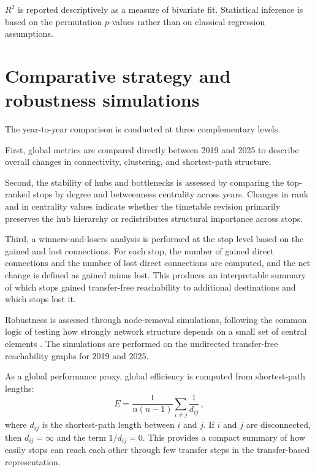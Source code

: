 \documentclass[12pt,a4paper,oneside]{report}
\begin{document}
$R^{2}$ is reported descriptively as a measure of bivariate fit.
Statistical inference is based on the permutation $p$-values rather than on classical regression assumptions.

\section{Comparative strategy and robustness simulations}\label{sec:comparative}

The year-to-year comparison is conducted at three complementary levels.

First, global metrics are compared directly between 2019 and 2025 to describe overall changes in connectivity, clustering, and shortest-path structure.

Second, the stability of hubs and bottlenecks is assessed by comparing the top-ranked stops by degree and betweenness centrality across years.
Changes in rank and in centrality values indicate whether the timetable revision primarily preserves the hub hierarchy or redistributes structural importance across stops.

Third, a winners-and-losers analysis is performed at the stop level based on the gained and lost connections.
For each stop, the number of gained direct connections and the number of lost direct connections are computed, and the net change is defined as gained minus lost.
This produces an interpretable summary of which stops gained transfer-free reachability to additional destinations and which stops lost it.

Robustness is assessed through node-removal simulations, following the common logic of testing how strongly network structure depends on a small set of central elements \citep{derrible2010}.
The simulations are performed on the undirected transfer-free reachability graphs for 2019 and 2025.

As a global performance proxy, global efficiency is computed from shortest-path lengths:
\begin{equation}\label{eq:efficiency}
  E = \frac{1}{n(n-1)} \sum_{i \neq j} \frac{1}{d_{ij}}\,,
\end{equation}
where $d_{ij}$ is the shortest-path length between $i$ and $j$.
If $i$ and $j$ are disconnected, then $d_{ij} = \infty$ and the term $1/d_{ij} = 0$.
This provides a compact summary of how easily stops can reach each other through few transfer steps in the transfer-based representation.
\end{document}
